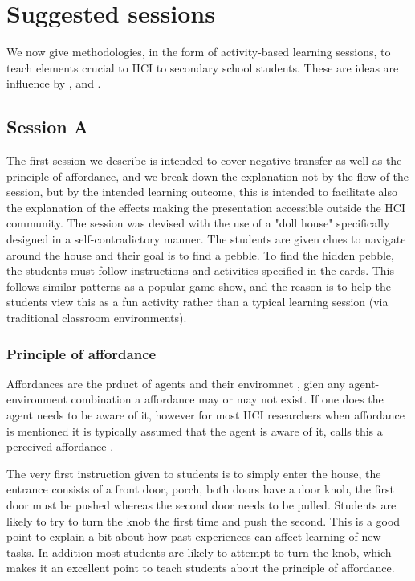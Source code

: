 \documentclass{sig-alternate}
\begin{document}
 
\section{Suggested sessions}
We now give methodologies, in the form of activity-based learning sessions, to teach elements crucial to HCI to secondary school students. These are ideas are influence by \cite{normanDesign}, \cite{rogers2011interaction} and \cite{shneiderman1986designing}.
\subsection{Session A}
The first session we describe is intended to cover negative transfer as well as the principle of affordance, and we break down the explanation not by the flow of the session, but by the intended learning outcome, this is intended to facilitate also the explanation of the effects making the presentation accessible outside the HCI community. The session was devised with the use of a "doll house" specifically designed in a self-contradictory manner. The students are given clues to navigate around the house and their goal is to find a pebble. To find the hidden pebble, the students must follow instructions and activities specified in the cards. This follows similar patterns as a popular game show, and the reason is to help the students view this as a fun activity rather than a typical learning session (via traditional classroom environments).

\subsubsection*{Principle of affordance}
Affordances are the prduct of agents and their enviromnet \cite{gibson1977theory}, gien any agent-environment combination a affordance may or may not exist. If one does the agent needs to be aware of it, however for most HCI researchers when affordance is mentioned it is typically assumed that the agent is aware of it,  calls this a perceived affordance \cite{norman1999affordance}.

The very first instruction given to students is to simply enter the house, the entrance consists of a front door, porch, both doors have a door knob, the first door must be pushed whereas the second door needs to be pulled. Students are likely to try to turn the knob the first time and push the second. This is a good point to explain a bit about how past experiences can affect learning of new tasks. In addition most students are likely to attempt to turn the knob, which makes it an excellent point to teach students about the principle of affordance. 
\end{document}
